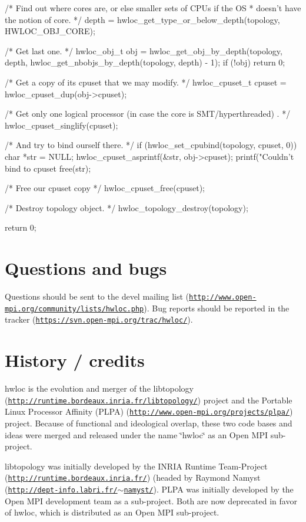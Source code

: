 \begin{DoxyCodeInclude}
{        /* Find out where cores are, or else smaller sets of CPUs if the OS
         * doesn't have the notion of core. */
        depth = hwloc_get_type_or_below_depth(topology, HWLOC_OBJ_CORE);

        /* Get last one.  */
        hwloc_obj_t obj = hwloc_get_obj_by_depth(topology, depth, 
      hwloc_get_nbobjs_by_depth(topology, depth) - 1);
        if (!obj)
                return 0;

        /* Get a copy of its cpuset that we may modify.  */
        hwloc_cpuset_t cpuset = hwloc_cpuset_dup(obj->cpuset);

        /* Get only one logical processor (in case the core is SMT/hyperthreaded)
      .  */
        hwloc_cpuset_singlify(cpuset);

        /* And try to bind ourself there.  */
        if (hwloc_set_cpubind(topology, cpuset, 0)) {
                char *str = NULL;
                hwloc_cpuset_asprintf(&str, obj->cpuset);
                printf("Couldn't bind to cpuset %
                free(str);
        }

        /* Free our cpuset copy */
        hwloc_cpuset_free(cpuset);

        /* Destroy topology object.  */
        hwloc_topology_destroy(topology);

        return 0;
}
\end{DoxyCodeInclude}


 \hypertarget{index_bugs}{}\section{Questions and bugs}\label{index_bugs}
Questions should be sent to the devel mailing list (\href{http://www.open-mpi.org/community/lists/hwloc.php}{\tt http://www.open-\/mpi.org/community/lists/hwloc.php}). Bug reports should be reported in the tracker (\href{https://svn.open-mpi.org/trac/hwloc/}{\tt https://svn.open-\/mpi.org/trac/hwloc/}).

 \hypertarget{index_history}{}\section{History / credits}\label{index_history}
hwloc is the evolution and merger of the libtopology (\href{http://runtime.bordeaux.inria.fr/libtopology/}{\tt http://runtime.bordeaux.inria.fr/libtopology/}) project and the Portable Linux Processor Affinity (PLPA) (\href{http://www.open-mpi.org/projects/plpa/}{\tt http://www.open-\/mpi.org/projects/plpa/}) project. Because of functional and ideological overlap, these two code bases and ideas were merged and released under the name \char`\"{}hwloc\char`\"{} as an Open MPI sub-\/project.

libtopology was initially developed by the INRIA Runtime Team-\/Project (\href{http://runtime.bordeaux.inria.fr/}{\tt http://runtime.bordeaux.inria.fr/}) (headed by Raymond Namyst (\href{http://dept-info.labri.fr/~namyst/}{\tt http://dept-\/info.labri.fr/$\sim$namyst/}). PLPA was initially developed by the Open MPI development team as a sub-\/project. Both are now deprecated in favor of hwloc, which is distributed as an Open MPI sub-\/project.

 
